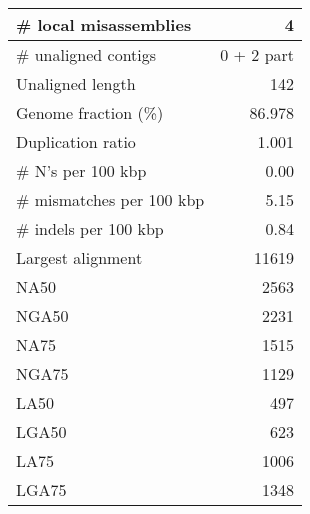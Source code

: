 \documentclass[12pt,a4paper]{article}
\begin{document}
\begin{table}[ht]
\begin{center}
\begin{tabular}{|l*{1}{|r}|}
\# local misassemblies & 4 \\ \hline
\# unaligned contigs & 0 + 2 part \\ \hline
Unaligned length & 142 \\ \hline
Genome fraction (\%) & 86.978 \\ \hline
Duplication ratio & 1.001 \\ \hline
\# N's per 100 kbp & 0.00 \\ \hline
\# mismatches per 100 kbp & 5.15 \\ \hline
\# indels per 100 kbp & 0.84 \\ \hline
Largest alignment & 11619 \\ \hline
NA50 & 2563 \\ \hline
NGA50 & 2231 \\ \hline
NA75 & 1515 \\ \hline
NGA75 & 1129 \\ \hline
LA50 & 497 \\ \hline
LGA50 & 623 \\ \hline
LA75 & 1006 \\ \hline
LGA75 & 1348 \\ \hline
\end{tabular}
\end{center}
\end{table}
\end{document}
